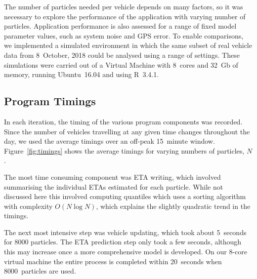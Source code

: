 The number of particles needed per vehicle 
depends on many factors,
so it was necessary to explore the performance of the application
with varying number of particles.
Application performance is also assessed
for a range of fixed model parameter values,
such as system noise and GPS error.
To enable comparisons, we implemented a simulated \rt environment
in which the same subset of real vehicle data from 8~October, 2018
could be analysed using a range of settings.
These simulations were carried out of a Virtual Machine 
with 8~cores and 32~Gb of memory, 
running Ubuntu~16.04 and using R~3.4.1.


\subsection{Program Timings}
\label{sec:timings}

In each iteration, 
the timing of the various program components was recorded.
Since the number of vehicles travelling at any given time changes throughout the day,
we used the average timings over an off-peak 15~minute window.
Figure~\ref{fig:timings} shows the average timings for 
varying numbers of particles, $N$.


The most time consuming component was ETA writing,
which involved summarising the individual ETAs estimated for each particle.
While not discussed here this involved computing quantiles which uses a sorting algorithm
with complexity $O(N \log N)$,
which explains the slightly quadratic trend in the timings.


The next most intensive step was vehicle updating,
which took about 5~seconds for 8000 particles.
The ETA prediction step only took a few seconds,
although this may increase once a more comprehensive model is developed.
On our 8-core virtual machine the entire process is completed within 20~seconds
when 8000~particles are used.



